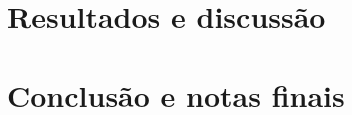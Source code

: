 \documentclass[12pt,a4paper,oneside]{article}
\begin{document}

\section{Resultados e discussão}
\label{sec:res}


\section{Conclusão e notas finais}
\label{sec:con}

\cite{shimbel1953structural}



\end{document}

